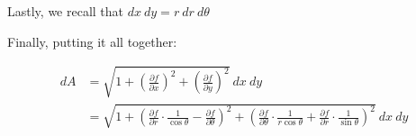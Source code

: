 \documentclass[letterpaper]{article}
\begin{document}
Lastly, we recall that \(dx\ dy = r\ dr\ d\theta\)

Finally, putting it all together:

\begin{align}
  dA &= \sqrt{1 + \left(\frac{\partial f}{\partial x}\right)^2 + \left(\frac{\partial f}{\partial y}\right)^2}\ dx\ dy\\
&= \sqrt{1 + \left(\frac{\partial f}{\partial r}\cdot \frac{1}{\cos\theta}-\frac{\partial f}{\partial \theta}\right)^2 + \left(\frac{\partial f}{\partial \theta}\cdot \frac{1}{r\cos\theta} + \frac{\partial f}{\partial r}\cdot \frac{1}{\sin\theta}\right)^2}\ dx\ dy\\
\end{align}
\end{document}
